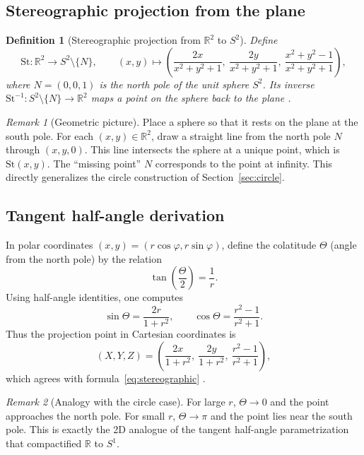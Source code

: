 \documentclass[12pt]{article}
\newtheorem{definition}{Definition}
\theoremstyle{remark}
\newtheorem*{remark}{Remark}
\begin{document}
\subsection{Stereographic projection from the plane}

\begin{definition}[Stereographic projection from $\mathbb{R}^2$ to $S^2$]
Define 
\begin{equation}\label{eq:stereographic}
\mathrm{St}:\mathbb{R}^2 \to S^2\setminus\{N\}, \qquad
(x,y)\mapsto \left(\frac{2x}{x^2+y^2+1},\ \frac{2y}{x^2+y^2+1},\ \frac{x^2+y^2-1}{x^2+y^2+1}\right),
\end{equation}
where $N=(0,0,1)$ is the north pole of the unit sphere $S^2$. Its inverse 
$\mathrm{St}^{-1}:S^2\setminus\{N\}\to\mathbb{R}^2$ maps a point on the sphere 
back to the plane \citep{Munkres2000,Hatcher2002}.
\end{definition}

\begin{remark}[Geometric picture]
Place a sphere so that it rests on the plane at the south pole. For each 
$(x,y)\in\mathbb{R}^2$, draw a straight line from the north pole $N$ through 
$(x,y,0)$. This line intersects the sphere at a unique point, which is 
$\mathrm{St}(x,y)$. The “missing point” $N$ corresponds to the point at infinity.  
This directly generalizes the circle construction of Section~\ref{sec:circle}.
\end{remark}

\subsection{Tangent half-angle derivation}

In polar coordinates $(x,y) = (r\cos\varphi,r\sin\varphi)$, define the colatitude 
$\Theta$ (angle from the north pole) by the relation
\[
\tan\!\left(\frac{\Theta}{2}\right) = \frac{1}{r}.
\]
Using half-angle identities, one computes
\[
\sin\Theta = \frac{2r}{1+r^2}, \qquad \cos\Theta = \frac{r^2-1}{r^2+1}.
\]
Thus the projection point in Cartesian coordinates is
\begin{equation}
(X,Y,Z) = \left(\frac{2x}{1+r^2},\ \frac{2y}{1+r^2},\ \frac{r^2-1}{r^2+1}\right),
\end{equation}
which agrees with formula~\eqref{eq:stereographic} 
\citep[see][]{Needham1997}.
  
\begin{remark}[Analogy with the circle case]
For large $r$, $\Theta \to 0$ and the point approaches the north pole.  
For small $r$, $\Theta \to \pi$ and the point lies near the south pole.  
This is exactly the 2D analogue of the tangent half-angle parametrization 
that compactified $\mathbb{R}$ to $S^1$.  
\end{remark}
\end{document}
